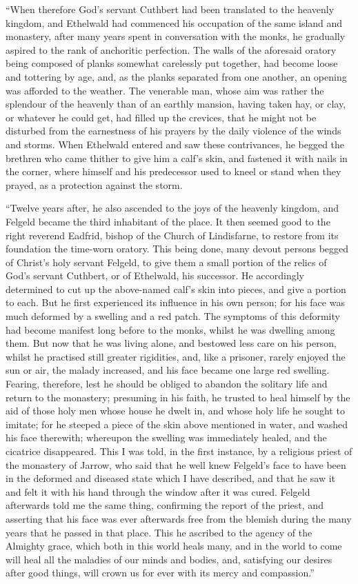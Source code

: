``When therefore God's servant Cuthbert had been
translated to the heavenly kingdom, and Ethelwald had commenced his
occupation of the same island and monastery, after many years spent in
conversation with the monks, he gradually aspired to the rank of
anchoritic perfection. The walls of the aforesaid oratory being
composed of planks somewhat carelessly put together, had become loose
and tottering by age, and, as the planks separated from one another,
an opening was afforded to the weather. The venerable man, whose aim
was rather the splendour of the heavenly than of an earthly mansion,
having taken hay, or clay, or whatever he could get, had filled up the
crevices, that he might not be disturbed from the earnestness of his
prayers by the daily violence of the winds and storms. When Ethelwald
entered and saw these contrivances, he begged the brethren who came
thither to give him a calf's skin, and fastened it with nails in the
corner, where himself and his predecessor used to kneel or stand when
they prayed, as a protection against the storm.

``Twelve years after, he also ascended to the joys
of the heavenly kingdom, and Felgeld became the third inhabitant of
the place. It then seemed good to the right reverend Eadfrid, bishop
of the Church of Lindisfarne, to restore from its foundation the time-worn oratory. This being done, many devout persons begged of
Christ's holy servant Felgeld, to give them a small portion of the
relics of God's servant Cuthbert, or of Ethelwald, his successor. He
accordingly determined to cut up the above-named calf's skin into
pieces, and give a portion to each. But he first experienced its
influence in his own person; for his face was much deformed by a
swelling and a red patch. The symptoms of this deformity had become
manifest long before to the monks, whilst he was dwelling among them.
But now that he was living alone, and bestowed less care on his
person, whilst he practised still greater rigidities, and, like a
prisoner, rarely enjoyed the sun or air, the malady increased, and his
face became one large red swelling. Fearing, therefore, lest he should
be obliged to abandon the solitary life and return to the monastery;
presuming in his faith, he trusted to heal himself by the aid of those
holy men whose house he dwelt in, and whose holy life he sought to
imitate; for he steeped a piece of the skin above mentioned in water,
and washed his face therewith; whereupon the swelling was immediately
healed, and the cicatrice disappeared. This I was told, in the first
instance, by a religious priest of the monastery of Jarrow, who said
that he well knew Felgeld's face to have been in the deformed and
diseased state which I have described, and that he saw it and felt it
with his hand through the window after it was cured. Felgeld
afterwards told me the same thing, confirming the report of the
priest, and asserting that his face was ever afterwards free from the
blemish during the many years that he passed in that place. This
he ascribed to the agency of the Almighty grace, which both in this
world heals many, and in the world to come will heal all the maladies
of our minds and bodies, and, satisfying our desires after good
things, will crown us for ever with its mercy and compassion.''

